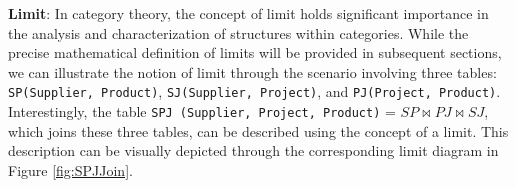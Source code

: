 


\smallskip


\noindent  \textbf{Limit}:  In category theory, the concept of limit holds significant importance in the analysis and characterization of structures within categories.  While the precise mathematical definition of limits will be provided in subsequent sections, we can illustrate the notion of limit through the scenario involving three tables: \texttt{SP(Supplier, Product)}, \texttt{SJ(Supplier, Project)}, and \texttt{PJ(Project, Product)}. Interestingly, the table \texttt{SPJ (Supplier, Project, Product)} = $SP \bowtie PJ \bowtie SJ$, which joins these three tables, can be described using the concept of a limit. This description can be visually depicted through the corresponding limit diagram in Figure \ref{fig:SPJJoin}.


